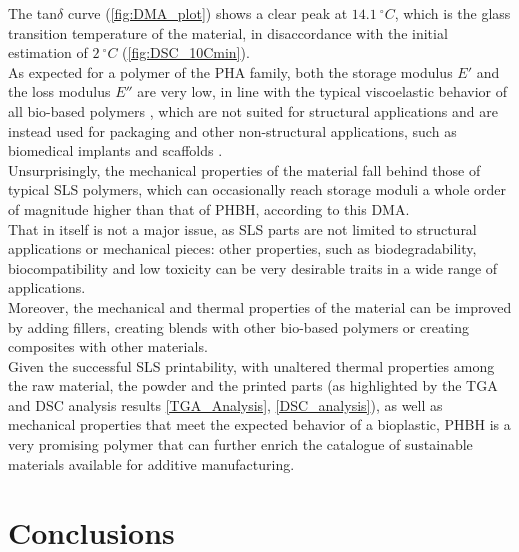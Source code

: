 \documentclass{article}
\begin{document}
    \clearpage 

    The tan$\delta$ curve (\ref{fig:DMA_plot}) shows a clear peak at $14.1 \ ^{\circ}C$, which is the glass transition temperature of the material, 
    in disaccordance with the initial estimation of $2 \ ^{\circ}C$ (\ref{fig:DSC_10Cmin}). \\ 

    As expected for a polymer of the PHA family, both the storage modulus $E'$ and the loss modulus $E''$ are very low, in line with the 
    typical viscoelastic behavior of all bio-based polymers \autocites{Kovalcik_PHA_Review}, which are not suited for structural applications and 
    are instead used for packaging and other non-structural applications, such as biomedical implants and scaffolds \autocites{Messori_Bondioli_PHAs}. \\

    Unsurprisingly, the mechanical properties of the material fall behind those of typical SLS polymers, which can 
    occasionally reach storage moduli a whole order of magnitude higher than that of PHBH, according to this DMA. \\ 
    
    That in itself is not a major issue, as SLS parts are not limited to structural applications or mechanical pieces:
    other properties, such as biodegradability, biocompatibility and low toxicity can be very desirable traits in a wide range of 
    applications. \\ 

    Moreover, the mechanical and thermal properties of the material can be improved by adding fillers, creating blends with other 
    bio-based polymers or creating composites with other materials. \\ 

    Given the successful SLS printability, with unaltered thermal properties among the raw material, the powder and the 
    printed parts (as highlighted by the TGA and DSC analysis results \ref{TGA_Analysis}, \ref{DSC_analysis}), as well as 
    mechanical properties that meet the expected behavior of a bioplastic, PHBH is a very promising polymer 
    that can further enrich the catalogue of sustainable materials available for additive manufacturing. \\ 

    \section{Conclusions\label{conclusions}}
\end{document}
